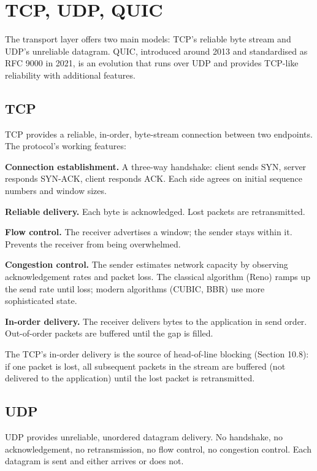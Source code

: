 \section{TCP, UDP, QUIC}

The transport layer offers two main models: TCP's reliable byte stream and UDP's unreliable datagram. QUIC, introduced around 2013 and standardised as RFC 9000 in 2021, is an evolution that runs over UDP and provides TCP-like reliability with additional features.

\subsection{TCP}

TCP provides a reliable, in-order, byte-stream connection between two endpoints. The protocol's working features:

\textbf{Connection establishment.} A three-way handshake: client sends SYN, server responds SYN-ACK, client responds ACK. Each side agrees on initial sequence numbers and window sizes.

\textbf{Reliable delivery.} Each byte is acknowledged. Lost packets are retransmitted.

\textbf{Flow control.} The receiver advertises a window; the sender stays within it. Prevents the receiver from being overwhelmed.

\textbf{Congestion control.} The sender estimates network capacity by observing acknowledgement rates and packet loss. The classical algorithm (Reno) ramps up the send rate until loss; modern algorithms (CUBIC, BBR) use more sophisticated state.

\textbf{In-order delivery.} The receiver delivers bytes to the application in send order. Out-of-order packets are buffered until the gap is filled.

The TCP's in-order delivery is the source of head-of-line blocking (Section 10.8): if one packet is lost, all subsequent packets in the stream are buffered (not delivered to the application) until the lost packet is retransmitted.

\subsection{UDP}

UDP provides unreliable, unordered datagram delivery. No handshake, no acknowledgement, no retransmission, no flow control, no congestion control. Each datagram is sent and either arrives or does not.

